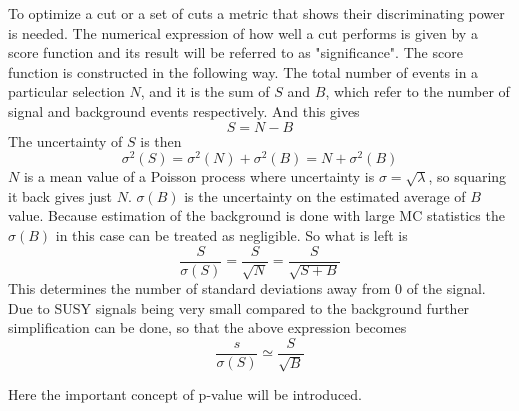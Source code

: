 To optimize a cut or a set of cuts a metric that shows their discriminating power is needed. The numerical expression of how well a cut performs is given by a score function and its result will be referred to as "significance". The score function is constructed in the following way.
The total number of events in a particular selection $N$, and it is the sum of $S$ and $B$, which refer to the number of signal and background events respectively. And this gives
\begin{equation}
S = N -B
\end{equation}
The uncertainty of $S$ is then
\begin{equation}
\sigma^2(S) = \sigma^2(N) + \sigma^2(B) = N+\sigma^2(B)
\end{equation}
$N$ is a mean value of a Poisson process where uncertainty is $\sigma = \sqrt{\lambda}$, so squaring it back gives just $N$. 
$\sigma(B)$ is the uncertainty on the estimated average of $B$ value. 
Because estimation of the background is done with large MC statistics the $\sigma(B)$ in this case can be treated as negligible. So what is left is
\begin{equation}
\frac{S}{\sigma(S)} = \frac{S}{\sqrt{N}} = \frac{S}{\sqrt{S+B}}
\end{equation}
This determines the number of standard deviations away from 0 of the signal. Due to SUSY signals being very small compared to the background further simplification can be done, so that the above expression becomes
\begin{equation}
\frac{s}{\sigma(S)}\simeq \frac{S}{\sqrt{B}}
\end{equation} 

Here the important concept of p-value will be introduced. 
 

